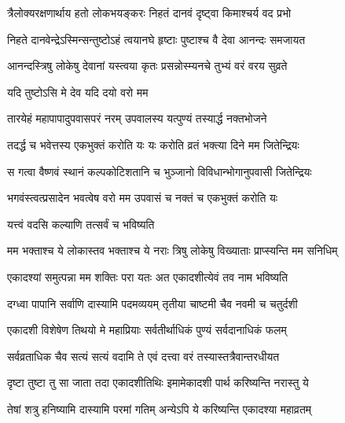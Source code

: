 \twolineshloka
{त्रैलोक्यरक्षणार्थाय हतो लोकभयङ्करः}
{निहतं दानवं दृष्ट्वा किमाश्चर्य वद प्रभो} %


\twolineshloka
{निहते दानवेन्द्रेऽस्मिन्सन्तुष्टोऽहं त्वयानघे}
{हृष्टाः पुष्टाश्च वै देवा आनन्दः समजायत} %

\twolineshloka
{आनन्दस्त्रिषु लोकेषु देवानां यस्त्वया कृतः}
{प्रसन्नोस्म्यनचे तुभ्यं वरं वरय सुव्रते} %



\onelineshloka
{यदि तुष्टोऽसि मे देव यदि दयो वरो मम} %

\twolineshloka
{तारयेहं महापापादुपवासपरं नरम्}
{उपवालस्य यत्पुण्यं तस्यार्द्ध नक्तभोजने} %

\twolineshloka
{तदर्द्ध च भवेत्तस्य एकभुक्तं करोति यः}
{यः करोति व्रतं भक्त्या दिने मम जितेन्द्रियः} %

\twolineshloka
{स गत्वा वैष्णवं स्थानं कल्पकोटिशतानि च}
{भुञ्जानो विविधान्भोगानुपवासी जितेन्द्रियः} %

\twolineshloka
{भगवंस्त्वत्प्रसादेन भवत्वेष वरो मम}
{उपवासं च नक्तं च एकभुक्तं करोति यः} %



\onelineshloka
{यत्त्वं वदसि कल्याणि तत्सर्वं च भविष्यति} %

\twolineshloka
{मम भक्ताश्च ये लोकास्तव भक्ताश्च ये नराः}
{त्रिषु लोकेषु विख्याताः प्राप्स्यन्ति मम सनिधिम्} %

\twolineshloka
{एकादश्यां समुत्पन्ना मम शक्तिः परा यतः}
{अत एकादशीत्येवं तव नाम भविष्यति} %

\twolineshloka
{दग्ध्वा पापानि सर्वाणि दास्यामि पदमव्ययम्}
{तृतीया चाष्टमी चैव नवमी च चतुर्दशी} %

\twolineshloka
{एकादशी विशेषेण तिथयो मे महाप्रियाः}
{सर्वतीर्थाधिकं पुण्यं सर्वदानाधिकं फलम्} %

\twolineshloka
{सर्वव्रताधिक चैव सत्यं सत्यं वदामि ते}
{एवं दत्त्वा वरं तस्यास्तत्रैवान्तरधीयत} %

\twolineshloka
{दृष्टा तुष्टा तु सा जाता तदा एकादशीतिथिः}
{इमामेकादशी पार्थ करिष्यन्ति नरास्तु ये} %

\twolineshloka
{तेषां शत्रु हनिष्यामि दास्यामि परमां गतिम्}
{अन्येऽपि ये करिष्यन्ति एकादश्या महाव्रतम्} %


